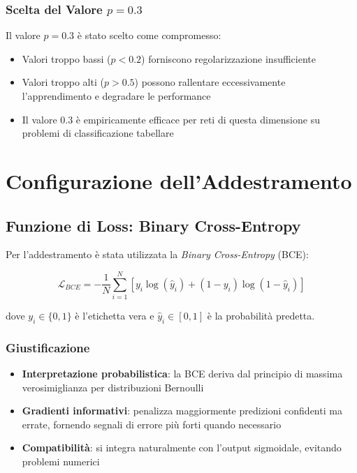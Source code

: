 \subsubsection{Scelta del Valore $p = 0.3$}

Il valore $p = 0.3$ è stato scelto come compromesso:
\begin{itemize}
    \item Valori troppo bassi ($p < 0.2$) forniscono regolarizzazione insufficiente
    \item Valori troppo alti ($p > 0.5$) possono rallentare eccessivamente l'apprendimento e degradare le performance
    \item Il valore 0.3 è empiricamente efficace per reti di questa dimensione su problemi di classificazione tabellare
\end{itemize}

\section{Configurazione dell'Addestramento}

\subsection{Funzione di Loss: Binary Cross-Entropy}

Per l'addestramento è stata utilizzata la \textit{Binary Cross-Entropy} (BCE):

\begin{equation}
    \mathcal{L}_{BCE} = -\frac{1}{N} \sum_{i=1}^{N} \left[ y_i \log(\hat{y}_i) + (1 - y_i) \log(1 - \hat{y}_i) \right]
\end{equation}

dove $y_i \in \{0, 1\}$ è l'etichetta vera e $\hat{y}_i \in [0, 1]$ è la probabilità predetta.

\subsubsection{Giustificazione}

\begin{itemize}
    \item \textbf{Interpretazione probabilistica}: la BCE deriva dal principio di massima verosimiglianza per distribuzioni Bernoulli
    \item \textbf{Gradienti informativi}: penalizza maggiormente predizioni confidenti ma errate, fornendo segnali di errore più forti quando necessario
    \item \textbf{Compatibilità}: si integra naturalmente con l'output sigmoidale, evitando problemi numerici
\end{itemize}

